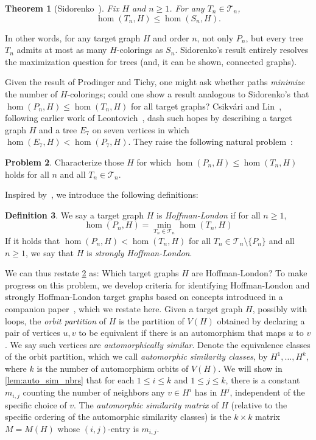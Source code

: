 \documentclass[11pt]{article}
\newtheorem{theorem}{Theorem}[section]
\theoremstyle{definition}
\newtheorem{definition}[theorem]{Definition}
\newtheorem{problem}[theorem]{Problem}
\begin{document}
\begin{theorem}[Sidorenko~\cite{Sidorenko1994}] \label{thm:siderenko}
Fix $H$ and $n \ge 1$. For any $T_n \in {\mathcal T}_n$,
\[
\hom(T_n,H) \le \hom(S_n,H).
\]
\end{theorem}
In other words, for any target graph $H$ and order $n$, not only $P_n$, but every tree $T_n$ admits at most as many $H$-colorings as $S_n$. Sidorenko's result entirely resolves the maximization question for trees (and, it can be shown, connected graphs).

Given the result of Prodinger and Tichy, one might ask whether paths \emph{minimize} the number of $H$-colorings; could one show a result analogous to Sidorenko's that $\hom(P_n,H) \le \hom(T_n,H)$ for all target graphs? Csikv\'{a}ri and Lin~\cite{CsikvariLin2014}, following earlier work of Leontovich~\cite{Leontovich1989}, dash such hopes by describing a target graph $H$ and a tree $E_7$ on seven vertices in which $\hom(E_7, H) < \hom(P_7, H)$. They raise the following natural problem~\cite[Problem 6.2]{CsikvariLin2014}:
\begin{problem} \label{prob:CL}
Characterize those $H$ for which $\hom(P_n,H) \le \hom(T_n,H)$ holds for all $n$ and all $T_n \in {\mathcal T}_n$.
\end{problem}
Inspired by~\cite{Hoffman1967, London1966}, we introduce the following definitions:
\begin{definition} \label{defn:HL}
We say a target graph $H$ is \emph{Hoffman-London} if for all $n \ge 1$,
\begin{equation} \label{eq:HL-defn}
\hom(P_n,H) = \min_{T_n \in \mathcal{T}_n} \hom(T_n,H)
\end{equation}
If it holds that $\hom(P_n, H) < \hom(T_n, H)$ for all $T_n \in \mathcal{T}_n \setminus \{P_n\}$ and all $n \ge 1$, we say that $H$ is \emph{strongly Hoffman-London}.
\end{definition}

We can thus restate \cref{prob:CL} as: Which target graphs $H$ are Hoffman-London? To make progress on this problem, we develop criteria for identifying Hoffman-London and strongly Hoffman-London target graphs based on concepts introduced in a companion paper~\cite{GalvinMcMillonNirRedlich2025}, which we restate here. Given a target graph $H$, possibly with loops, the \emph{orbit partition} of $H$ is the partition of $V(H)$ obtained by declaring a pair of vertices $u, v$ to be equivalent if there is an automorphism that maps $u$ to $v$. We say such vertices are \emph{automorphically similar}. Denote the equivalence classes of the orbit partition, which we call \emph{automorphic similarity classes}, by $H^1, \ldots, H^k$, where $k$ is the number of automorphism orbits of $V(H)$. We will show in \cref{lem:auto_sim_nbrs} that for each $1 \le i \le k$ and $1 \le j \le k$, there is a constant $m_{i,j}$ counting the number of neighbors any $v \in H^i$ has in $H^j$, independent of the specific choice of $v$. The \emph{automorphic similarity matrix} of $H$ (relative to the specific ordering of the automorphic similarity classes) is the $k \times k$ matrix $M = M(H)$ whose $(i,j)$-entry is $m_{i,j}$.
\end{document}
